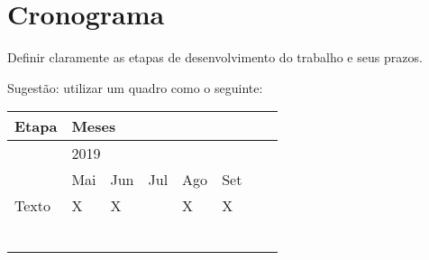 \documentclass[prop-esp]{iiufrgs}
\begin{document}
%
\chapter{Cronograma}

\noindent Definir claramente as etapas de desenvolvimento do trabalho e seus prazos.

\noindent 

\noindent Sugest\~{a}o: utilizar um quadro como o seguinte:

\noindent 

\begin{tabular}{|p{1.8in}|p{0.3in}|p{0.3in}|p{0.3in}|p{0.3in}|p{0.3in}|p{0.3in}|p{0.3in}|} \hline 
Etapa & \multicolumn{7}{|p{2.0in}|}{Meses} \\ \hline 
 & \multicolumn{5}{|p{1.4in}|}{2019} \\ 
 & Mai & Jun & Jul & Ago & Set \\ \hline 
Texto & X & X &  & X & X \\ \hline 
 &  &  &  &  &  \\ \hline 
 &  &  &  &  &  \\ \hline 
 &  &  &  &  &  \\ \hline 
 &  &  &  &  & \\ \hline 
 &  &  &  &  & \\ \hline 
 &  &  &  &  & \\ \hline 
\end{tabular}



%


\end{document}
